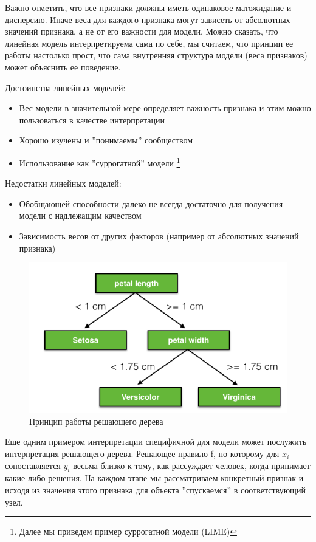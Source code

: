 \documentclass[12pt]{article}
\begin{document}
Важно отметить, что все признаки должны иметь одинаковое матожидание и дисперсию. 
Иначе веса для каждого признака могут зависеть от абсолютных значений признака, а не от его важности для модели.
Можно сказать, что линейная модель интерпретируема сама по себе, мы считаем, что принцип ее работы настолько прост, что 
сама внутренняя структура модели (веса признаков) может объяснить ее поведение. 

\newpage
\noindent
Достоинства линейных моделей:
\begin{itemize}
    \item Вес модели в значительной мере определяет важность признака и этим можно пользоваться в качестве интерпретации
    \item Хорошо изучены и ''понимаемы'' сообществом 
    \item Использование как ''суррогатной'' модели \footnote{Далее мы приведем пример суррогатной модели (LIME)}
\end{itemize}

\noindent
Недостатки линейных моделей:
\begin{itemize}
    \item Обобщающей способности далеко не всегда достаточно для получения модели с надлежащим качеством
    \item Зависимость весов от других факторов (например от абсолютных значений признака)
\end{itemize}

\begin{figure}[htb]
    \centering
    \includegraphics[width=0.5\linewidth]{decision_tree_0.png}
    \caption{Принцип работы решающего дерева}
    \label{decision_tree}
\end{figure}

Еще одним примером интерпретации специфичной для модели может послужить интерпретация решающего дерева. 
Решающее правило f, по которому для $x_i$ сопоставляется $y_i$ весьма близко к тому, как рассуждает человек, когда принимает какие-либо решения.
На каждом этапе мы рассматриваем конкретный признак и исходя из значения этого признака для объекта ''спускаемся'' в соответствующий узел. 
\end{document}
